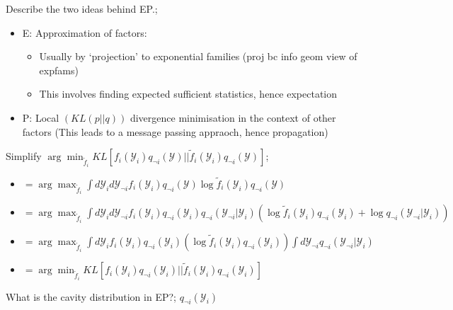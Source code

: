\documentclass{article}
\begin{document}
Describe the two ideas behind EP.; \begin{itemize} \item E: Approximation of factors: \begin{itemize} \item Usually by `projection' to exponential families (proj bc info geom view of expfams) \item This involves finding expected sufficient statistics, hence expectation \end{itemize} \item P: Local $(KL(p||q))$ divergence minimisation in the context of other factors (This leads to a message passing appraoch, hence propagation) \end{itemize}

Simplify $\arg\min_{\tilde{f}_i}KL[f_i(\mathcal{Y}_i)q_{\neg i}(\mathcal{Y})||\tilde{f}_i(\mathcal{Y}_i)q_{\neg i}(\mathcal{Y})]$; \begin{itemize} \item $=\arg\max_{\tilde{f}_i} \int d\mathcal{Y}_i d\mathcal{Y}_{\neg i} f_i(\mathcal{Y}_i)q_{\neg i}(\mathcal{Y})\log \tilde{f}_i(\mathcal{Y}_i) q_{\neg i}(\mathcal{Y})$ \item $=\arg\max_{\tilde{f}_i} \int d\mathcal{Y}_i d\mathcal{Y}_{\neg i} f_i(\mathcal{Y}_i)q_{\neg i}(\mathcal{Y}_i)q_{\neg i}(\mathcal{Y}_{\neg i}|\mathcal{Y}_i)(\log \tilde{f}_i(\mathcal{Y}_i)q_{\neg i}(\mathcal{Y}_i)+\log q_{\neg i}(\mathcal{Y}_{\neg i}|\mathcal{Y}_i))$ \item $=\arg\max_{\tilde{f}_i} \int d\mathcal{Y}_i f_i(\mathcal{Y}_i)q_{\neg i}(\mathcal{Y}_i)(\log \tilde{f}_i(\mathcal{Y}_i)q_{\neg i}(\mathcal{Y}_i)) \int d\mathcal{Y}_{\neg i} q_{\neg i}(\mathcal{Y}_{\neg i}|\mathcal{Y}_i)$ \item $=\arg\min_{\tilde{f}_i}KL[f_i(\mathcal{Y}_i)q_{\neg i}(\mathcal{Y}_i)||\tilde{f}_i(\mathcal{Y}_i)q_{\neg i}(\mathcal{Y}_i)]$ \end{itemize}

What is the cavity distribution in EP?; $q_{\neg i}(\mathcal{Y}_i)$
\end{document}

